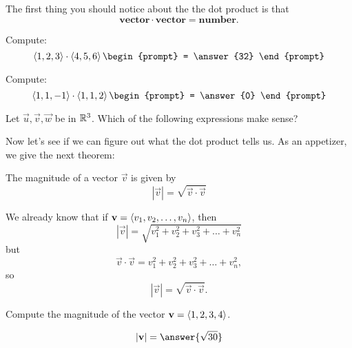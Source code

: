 \documentclass{ximera}
\begin{document}
The first thing you should notice about the the dot product is that
\[
\mathbf{vector}\cdot \mathbf{vector} = \mathbf{number}.
\]
\begin{question}
  Compute:
  \[
  \vector{1,2,3}\cdot\vector{4,5,6}
  \begin{prompt}
    = \answer{32}
  \end{prompt}
  \]
  \begin{question}
  Compute:
  \[
  \vector{1,1,-1}\cdot\vector{1,1,2}
  \begin{prompt}
    = \answer{0}
  \end{prompt}
  \]
\end{question}
\end{question}

\begin{question}
  Let $\vec{u},\vec{v},\vec{w}$ be in $\mathbb R^3$. Which of the following
  expressions make sense?
  \begin{selectAll}
  \end{selectAll}
\end{question}

Now let's see if we can figure out what the dot product tells us. As
an appetizer, we give the next theorem:

\begin{theorem}
  The magnitude of a vector $\vec{v}$ is given by
  \[
  |\vec{v}|=\sqrt{\vec{v}\cdot\vec{v}}
  \]
  \begin{explanation}
    We already know that if $\mathbf{v} = \left\langle v_1,v_2,\dots,v_n\right\rangle$,
    then
    \[
    |\vec{v}| = \sqrt{v_1^2+v_2^2+v_3^2+\dots+v_n^2}
    \]
    but
    \[
    \vec{v} \cdot \vec{v} = v_1^2+v_2^2+v_3^2+\dots+v_n^2,
    \]
    so
    \[
    |\vec{v}|=\sqrt{\vec{v}\cdot\vec{v}}.
    \]
  \end{explanation}
\end{theorem}

\begin{question}
  Compute the magnitude of the vector $\mathbf{v} = \left\langle 1,2,3,4\right\rangle$.
  \begin{prompt}
    \[
    |\vec{v}| = \answer{\sqrt{30}}
    \]
  \end{prompt}
\end{question}
\end{document}
